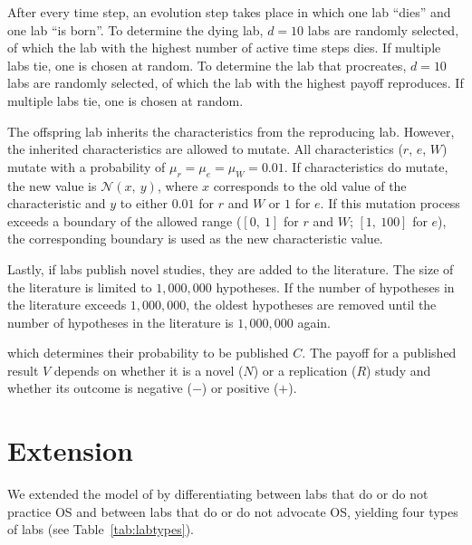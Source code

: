 \documentclass[meta, authordate,issue]{jote-new-article}
\begin{document}
\begin{adjustwidth}{-4cm}{}
\begin{tcolorbox}
{      After every time step, an evolution step takes place in which one lab ``dies'' and one lab ``is born''. To determine the dying lab, $d=10$ labs are randomly selected, of which the lab with the highest number of active time steps dies. If multiple labs tie, one is chosen at random. To determine the lab that procreates, $d=10$ labs are randomly selected, of which the lab with the highest payoff reproduces. If multiple labs tie, one is chosen at random.

      The offspring lab inherits the characteristics from the reproducing lab. However, the inherited characteristics are allowed to mutate. All characteristics ($r$, $e$, $W$) mutate with a probability of $\mu_r=\mu_e=\mu_W=0.01$. If characteristics do mutate, the new value is $\mathcal{N}\left(x,~y\right)$, where $x$ corresponds to the old value of the characteristic and $y$ to either $0.01$ for $r$ and $W$ or $1$ for $e$. If this mutation process exceeds a boundary of the allowed range ($\left[0,~1\right]$ for $r$ and $W$; $\left[1,~100\right]$ for $e$), the corresponding boundary is used as the new characteristic value.

      Lastly, if labs publish novel studies, they are added to the literature. The size of the literature is limited to $1,000,000$ hypotheses. If  the number of hypotheses in the literature exceeds $1,000,000$, the oldest hypotheses are removed until the number of hypotheses in the literature is $1,000,000$ again.

    }
  \end{tcolorbox}
\end{adjustwidth}
%


\noindent which determines their probability to be published $C$. The payoff for a published result $V$ depends on whether it is a novel ($N$) or a replication ($R$) study and whether its outcome is negative ($-$) or positive ($+$).


\section{Extension}

We extended the model of \textcite{SmaldinoMcelreath2016} by differentiating between labs that do or do not practice OS and between labs that do or do not advocate OS, yielding four types of labs (see Table~\ref{tab:labtypes}).
%
\end{document}
